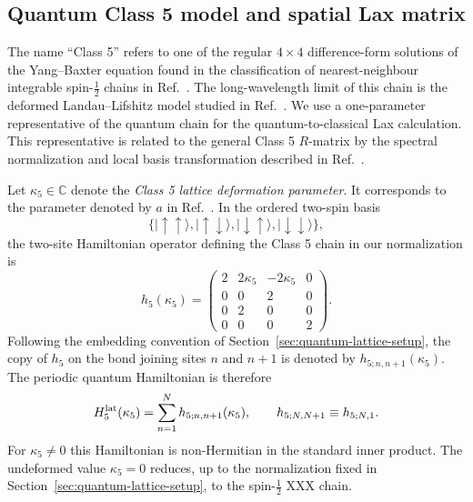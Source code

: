 \subsection{Quantum Class 5 model and spatial Lax matrix}
\label{sec:class5-spatial-lax}

The name ``Class 5'' refers to one of the regular $4\times4$ difference-form
solutions of the Yang--Baxter equation found in the classification of
nearest-neighbour integrable spin-$\tfrac12$ chains in
Ref.~\cite{deLeeuwPribytokRyan2019}.  The long-wavelength limit of this chain
is the deformed Landau--Lifshitz model studied in
Ref.~\cite{deLeeuwFontanellaNietoGarcia2026}.  We use a one-parameter
representative of the quantum chain for the quantum-to-classical Lax
calculation.  This representative is
related to the general Class 5 $R$-matrix by the spectral normalization and
local basis transformation described in
Ref.~\cite{deLeeuwFontanellaNietoGarcia2026}.

Let $\kappa_5\in\mathbb C$ denote the \emph{Class 5 lattice deformation parameter}.
It corresponds to the parameter denoted by $a$ in
Ref.~\cite{deLeeuwFontanellaNietoGarcia2026}.  In the
ordered two-spin basis
\begin{equation}
\bigl\{
|\!\uparrow\uparrow\rangle,
|\!\uparrow\downarrow\rangle,
|\!\downarrow\uparrow\rangle,
|\!\downarrow\downarrow\rangle
\bigr\},
\label{eq:class5-two-spin-basis}
\end{equation}
the two-site Hamiltonian operator defining the Class 5 chain in our
normalization is
\begin{equation}
h_5(\kappa_5)
=
\begin{pmatrix}
2&2\kappa_5&-2\kappa_5&0\\
0&0&2&0\\
0&2&0&0\\
0&0&0&2
\end{pmatrix}.
\label{eq:class5-local-hamiltonian}
\end{equation}
Following the embedding convention of Section~\ref{sec:quantum-lattice-setup},
the copy of $h_5$ on the bond joining sites $n$ and $n+1$ is denoted by
$h_{5;n,n+1}(\kappa_5)$.  The periodic quantum Hamiltonian is therefore
\begin{equation}
H^{\rm lat}_5(\kappa_5)
=
\sum_{n=1}^{N}h_{5;n,n+1}(\kappa_5),
\qquad
h_{5;N,N+1}\equiv h_{5;N,1}.
\label{eq:class5-lattice-hamiltonian}
\end{equation}
For $\kappa_5\neq0$ this Hamiltonian is non-Hermitian in the standard inner product.
The undeformed value $\kappa_5=0$ reduces, up to the normalization fixed in
Section~\ref{sec:quantum-lattice-setup}, to the spin-$\tfrac12$ XXX chain.

